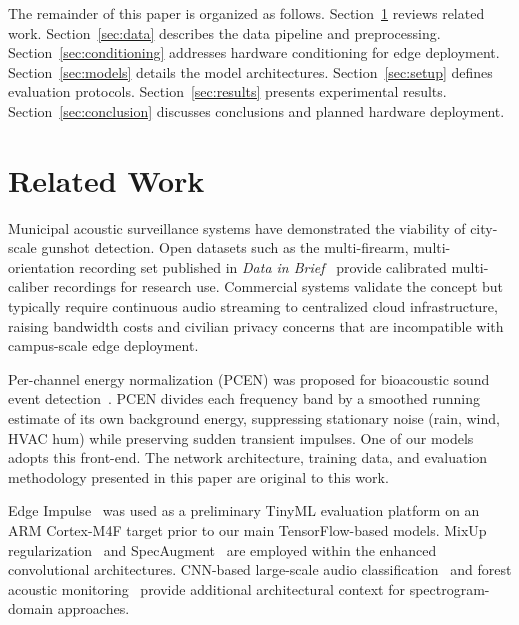 \documentclass[conference]{IEEEtran}
\begin{document}
The remainder of this paper is organized as follows. Section~\ref{sec:related} reviews related work. Section~\ref{sec:data} describes the data pipeline and preprocessing. Section~\ref{sec:conditioning} addresses hardware conditioning for edge deployment. Section~\ref{sec:models} details the model architectures. Section~\ref{sec:setup} defines evaluation protocols. Section~\ref{sec:results} presents experimental results. Section~\ref{sec:conclusion} discusses conclusions and planned hardware deployment.

\section{Related Work}
\label{sec:related}

Municipal acoustic surveillance systems have demonstrated the viability of city-scale gunshot detection. Open datasets such as the multi-firearm, multi-orientation recording set published in \emph{Data in Brief}~\cite{dib2023} provide calibrated multi-caliber recordings for research use. Commercial systems validate the concept but typically require continuous audio streaming to centralized cloud infrastructure, raising bandwidth costs and civilian privacy concerns that are incompatible with campus-scale edge deployment.

Per-channel energy normalization (PCEN) was proposed for bioacoustic sound event detection~\cite{lostanlen2019}. PCEN divides each frequency band by a smoothed running estimate of its own background energy, suppressing stationary noise (rain, wind, HVAC hum) while preserving sudden transient impulses. One of our models adopts this front-end. The network architecture, training data, and evaluation methodology presented in this paper are original to this work.

Edge Impulse~\cite{edgeimpulse2024} was used as a preliminary TinyML evaluation platform on an ARM Cortex-M4F target prior to our main TensorFlow-based models. MixUp regularization~\cite{zhang2018} and SpecAugment~\cite{park2019} are employed within the enhanced convolutional architectures. CNN-based large-scale audio classification~\cite{hershey2017} and forest acoustic monitoring~\cite{saha2025} provide additional architectural context for spectrogram-domain approaches.

\end{document}
